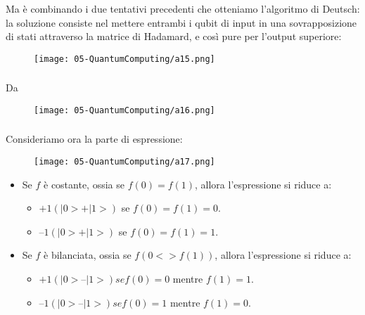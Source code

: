 \subsubsection{}
Ma è combinando i due tentativi precedenti che otteniamo l’algoritmo
di Deutsch: la soluzione consiste nel mettere entrambi i qubit di input
in una sovrapposizione di stati attraverso la matrice di Hadamard,
e così pure per l’output superiore:
\begin{figure}[!h]
    \centering
    \texttt{[image: 05-QuantumComputing/a15.png]}
\end{figure}

\subsubsection{}
Da 
\begin{figure}[!h]
    \centering
    \texttt{[image: 05-QuantumComputing/a16.png]}
\end{figure}
\subsubsection{}
Consideriamo ora la parte di espressione:
\begin{figure}[!h]
    \centering
    \texttt{[image: 05-QuantumComputing/a17.png]}
\end{figure}

\begin{itemize}
  \item Se $f$ è costante, ossia se $f(0) = f(1)$, allora l’espressione si riduce a:
    \begin{itemize}
      \item $+1(|0> + |1>)$ se $f(0) = f(1) = 0$.
      \item $–1(|0> + |1>)$ se $f(0) = f(1) =1$.
    \end{itemize}
  \item Se $f$ è bilanciata, ossia se $f(0 <> f(1))$, allora l’espressione si riduce a:
    \begin{itemize}
      \item $+1(|0> – |1>)se f(0) = 0$ mentre $f(1) = 1$.
      \item $–1(|0> – |1>)se f(0) = 1$ mentre $f(1) = 0$.
    \end{itemize}
\end{itemize}

